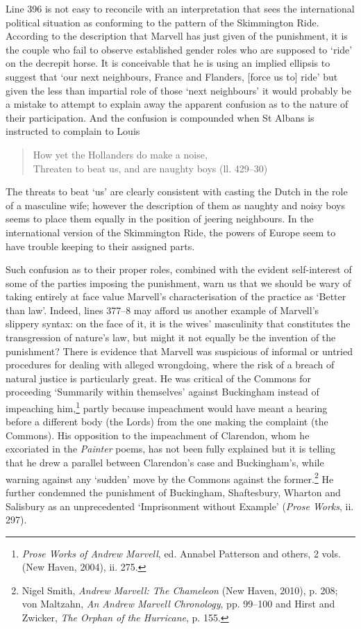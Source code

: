 ﻿\documentclass[12pt]{article}
\newcommand{\citedtitle}[1]{\textit{#1}}
\begin{document}
Line 396 is not easy to reconcile with an
interpretation that sees the international political situation as conforming to
the pattern of the Skimmington Ride. According to the description that Marvell
has just given of the punishment, it is the couple who fail to observe
established gender roles who are supposed to ‘ride’ on the decrepit horse. It
is conceivable that he is using an implied ellipsis to suggest that ‘our next
neighbours, France and Flanders, [force us to] ride’ but given the less than
impartial role of those ‘next neighbours’ it would probably be a mistake to
attempt to explain away the apparent confusion as to the nature of their
participation. And the confusion is compounded when St Albans is instructed to
complain to Louis

\begin{verse}
How yet the Hollanders do make a noise,\\
Threaten to beat us, and are naughty boys (ll. 429–30)
\end{verse}
The threats to beat ‘us’ are clearly consistent with casting the Dutch in the role
of a masculine wife; however the description of them as naughty and noisy boys
seems to place them equally in the position of jeering neighbours. In the
international version of the Skimmington Ride, the powers of Europe seem to
have trouble keeping to their assigned parts.

Such
confusion as to their proper roles, combined with the evident self-interest of
some of the parties imposing the punishment, warn us that we should be wary of
taking entirely at face value Marvell’s characterisation of the practice as
‘Better than law’. Indeed, lines 377–8 may afford us another example of
Marvell’s slippery syntax: on the face of it, it is the wives’ masculinity that
constitutes the transgression of nature’s law, but might it not equally be the invention
of the punishment? There is evidence that Marvell was suspicious of informal or
untried procedures for dealing with alleged wrongdoing, where the risk of a
breach of natural justice is particularly great. He was critical of the Commons
for proceeding ‘Summarily within themselves’ against Buckingham instead of
impeaching him,\footnote{\citedtitle{Prose
Works of Andrew Marvell}, ed. Annabel Patterson and others, 2 vols. (New Haven, 2004), ii. 275.}
partly because impeachment would have meant a hearing before a different body
(the Lords) from the one making the complaint (the Commons). His opposition to
the impeachment of Clarendon, whom he excoriated in the \citedtitle{Painter} poems, has not been
fully explained but it is telling that he drew a parallel between Clarendon’s
case and Buckingham’s, while warning against any ‘sudden’ move by the Commons
against the former.\footnote{Nigel Smith, \citedtitle{Andrew
Marvell: The Chameleon} (New Haven, 2010), p. 208; von Maltzahn, \citedtitle{An Andrew Marvell
Chronology}, pp. 99–100 and Hirst and Zwicker, \citedtitle{The Orphan of the Hurricane}, p. 155.}
He further condemned the punishment of Buckingham, Shaftesbury, Wharton and
Salisbury as an unprecedented ‘Imprisonment without Example’ (\citedtitle{Prose
Works}, ii. 297).
\end{document}
